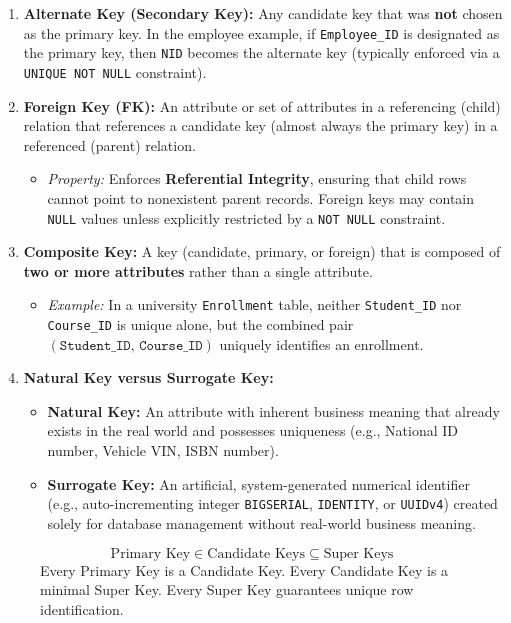 \begin{enumerate}
\item \textbf{Alternate Key (Secondary Key):}
Any candidate key that was \textbf{not} chosen as the primary key. In the employee example, if \texttt{Employee\_ID} is designated as the primary key, then \texttt{NID} becomes the alternate key (typically enforced via a \texttt{UNIQUE NOT NULL} constraint).

\item \textbf{Foreign Key (FK):}
An attribute or set of attributes in a referencing (child) relation that references a candidate key (almost always the primary key) in a referenced (parent) relation.
\begin{itemize}
\item \textit{Property:} Enforces \textbf{Referential Integrity}, ensuring that child rows cannot point to nonexistent parent records. Foreign keys may contain \texttt{NULL} values unless explicitly restricted by a \texttt{NOT NULL} constraint.
\end{itemize}

\item \textbf{Composite Key:}
A key (candidate, primary, or foreign) that is composed of \textbf{two or more attributes} rather than a single attribute.
\begin{itemize}
\item \textit{Example:} In a university \texttt{Enrollment} table, neither \texttt{Student\_ID} nor \texttt{Course\_ID} is unique alone, but the combined pair $(\texttt{Student\_ID, Course\_ID})$ uniquely identifies an enrollment.
\end{itemize}

\item \textbf{Natural Key versus Surrogate Key:}
\begin{itemize}
\item \textbf{Natural Key:} An attribute with inherent business meaning that already exists in the real world and possesses uniqueness (e.g., National ID number, Vehicle VIN, ISBN number).
\item \textbf{Surrogate Key:} An artificial, system-generated numerical identifier (e.g., auto-incrementing integer \texttt{BIGSERIAL}, \texttt{IDENTITY}, or \texttt{UUIDv4}) created solely for database management without real-world business meaning.
\end{itemize}
\end{enumerate}

\begin{figure}[htbp]
\centering
\begin{tcolorbox}[colback=white,colframe=black,title=\textbf{Mathematical Relationship Among Relational Keys}]
\[ \text{Primary Key} \in \text{Candidate Keys} \subseteq \text{Super Keys} \]
Every Primary Key is a Candidate Key. Every Candidate Key is a minimal Super Key. Every Super Key guarantees unique row identification.
\end{tcolorbox}
\end{figure}

